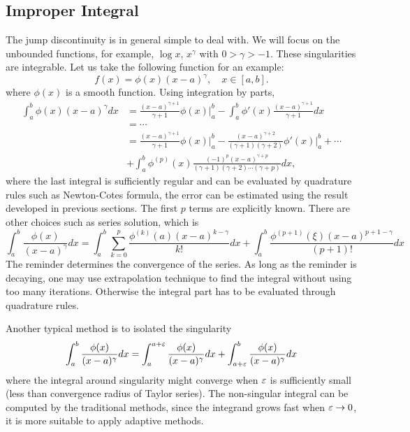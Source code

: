 \subsection{Improper Integral}
The jump discontinuity is in general simple to deal with. We will focus on the unbounded functions, for example, $\log x$, $x^{\gamma}$ with $0 > \gamma > -1$. These singularities are integrable. Let us take the following function for an example: 
$$ f(x ) = \phi(x) (x - a)^{\gamma},\quad x\in[a, b].$$
where $\phi(x)$ is a smooth function. Using integration by parts, 
\begin{equation}
    \begin{aligned}
        \int_a^b  \phi(x) (x - a)^{\gamma} dx &= \frac{(x-a)^{\gamma + 1}}{\gamma + 1} \phi(x)\Big|_a^b - \int_a^b \phi'(x) \frac{(x-a)^{\gamma + 1}}{\gamma + 1} dx \\
        &= \cdots \\
        &= \frac{(x-a)^{\gamma + 1}}{\gamma + 1} \phi(x)\Big|_a^b - \frac{(x-a)^{\gamma + 2}}{(\gamma + 1)(\gamma + 2)} \phi'(x)\Big|_a^b + \cdots \\
        & + \int_a^b \phi^{(p)} (x) \frac{(-1)^p (x-a)^{\gamma + p}}{(\gamma + 1)(\gamma + 2)\cdots (\gamma + p)}  dx  ,
    \end{aligned}
\end{equation}
where the last integral is sufficiently regular and can be evaluated by quadrature rules such as Newton-Cotes formula, the error can be estimated using the result developed in previous sections. The first $p$ terms are explicitly known. There are other choices such as series solution, which is 
\begin{equation}
   \int_a^b  \frac{\phi(x)}{(x - a)^{\gamma}} dx = \int_a^b  \sum_{k=0}^{p} \frac{\phi^{(k)}(a)(x-a)^{k -\gamma }}{k!} dx + \int_a^b \frac{\phi^{(p+1  )}(\xi)(x -a)^{p+1-\gamma }}{(p+1)!} dx 
\end{equation}
The reminder determines the convergence of the series. As long as the reminder is decaying, one may use extrapolation technique to find the integral without using too many iterations. Otherwise the integral part has to be evaluated through quadrature rules. 

Another typical method is to isolated the singularity 
\begin{equation}
    \int_a^b \frac{\phi(x)}{(x - a)^{\gamma}} dx =  \int_a^{a + \varepsilon} \frac{\phi(x)}{(x - a)^{\gamma}} dx +  \int_{a+\varepsilon}^b \frac{\phi(x)}{(x - a)^{\gamma}} dx
\end{equation}
where the integral around singularity might converge when $\varepsilon$ is sufficiently small (less than convergence radius of Taylor series). The non-singular integral can be computed by the traditional methods, since the integrand grows fast when $\varepsilon\to 0$, it is more suitable to apply adaptive methods.

